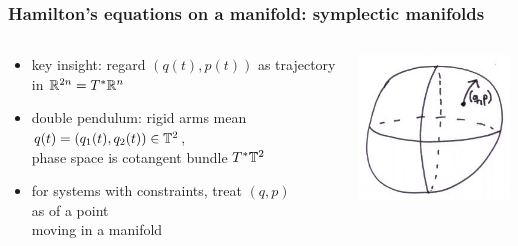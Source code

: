 \begin{frame}
  \frametitle{Hamilton's equations on a manifold: symplectic manifolds}
  \begin{columns}
    \begin{column}{0.72\textwidth}
      \begin{itemize}
        \item key insight: regard $(q(t), p(t))$ as trajectory\\in {} $\mathbb{R}^{2n} = T^\ast \mathbb{R}^n$

        \item double pendulum: rigid arms  mean\\
        $q(t)=(q_1(t),q_2(t))\in \mathbb{T}^{2}$,\\phase space is cotangent bundle $T^\ast \mathbb{T}^{2}$

        \item for systems with constraints, treat $(q,p)$\\as {} of a point\\moving in a manifold
      \end{itemize}
    \end{column}
    \begin{column}{0.3\textwidth}
      \hspace{-8mm}\mbox{\includegraphics[width=4cm]{images/phase_space.jpg}}
    \end{column}
  \end{columns}


\end{frame}
